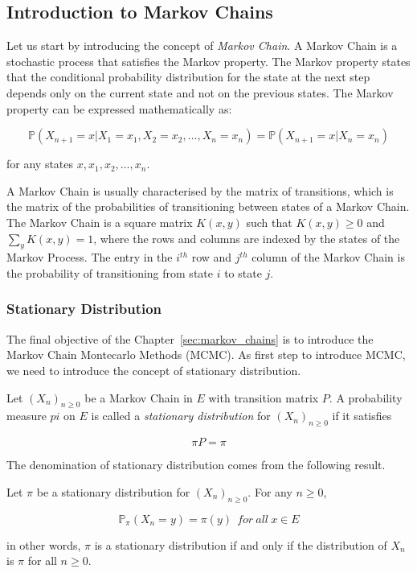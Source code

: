 \documentclass{article}
\begin{document}
\subsection{Introduction to Markov Chains}
\label{sec:introduction_markov_chains}

Let us start by introducing the concept of \textit{Markov Chain}. A Markov Chain is a stochastic process that satisfies the Markov property. The Markov property states that the conditional probability distribution for the state at the next step depends only on the current state and not on the previous states. The Markov property can be expressed mathematically as:

\[
	\mathbb{P}(X_{n+1} = x | X_1 = x_1, X_2 = x_2, \dots, X_n = x_n) = \mathbb{P}(X_{n+1} = x | X_n = x_n)
\]

for any states \(x, x_1, x_2, \dots, x_n\). 

A Markov Chain is usually characterised by the matrix of transitions, which is the matrix of the probabilities of transitioning between states of a Markov Chain. The Markov Chain is a square matrix $K(x,y)$ such that $K(x,y) \geq 0$ and \(\sum_{y} K(x,y) = 1\), where the rows and columns are indexed by the states of the Markov Process. The entry in the \(i^{th}\) row and \(j^{th}\) column of the Markov Chain is the probability of transitioning from state \(i\) to state \(j\).

\subsubsection{Stationary Distribution}
\label{sec:stationary_distribution}

The final objective of the Chapter~\ref{sec:markov_chains} is to introduce the Markov Chain Montecarlo Methods (MCMC). As first step to introduce MCMC, we need to introduce the concept of stationary distribution. 

\begin{definition}
	Let $(X_n)_{n \geq 0}$ be a Markov Chain in $E$ with transition matrix $P$. A probability measure $pi$ on $E$ is called a \textit{stationary distribution} for $(X_n)_{n \geq 0}$ if it satisfies 
	
	\[
		\pi P = \pi
	\]
\end{definition}

The denomination of stationary distribution comes from the following result.

\begin{proposition}
	Let $\pi$ be a stationary distribution for $(X_n)_{n \geq 0}$. For any \(n \geq 0\),

	\[
		\mathbb{P}_\pi(X_n = y) = \pi(y) \ \ for \ all \ x \in E
	\]

	in other words, $\pi$ is a stationary distribution if and only if the distribution of $X_n$ is $\pi$ for all $n \geq 0$.
\end{proposition}
\end{document}
